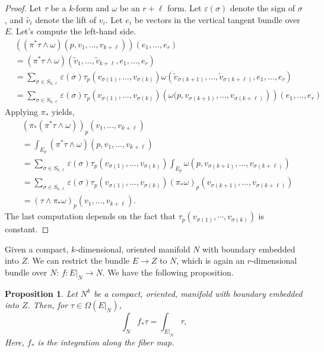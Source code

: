 \documentclass[12pt]{amsart}
\newtheorem{proposition}{Proposition}
\theoremstyle{remark}
\begin{document}
\begin{proof}
Let $\tau$ be a $k$-form and $\omega$ be an $r+\ell$ form. Let $\varepsilon(\sigma)$ denote the sign of $\sigma$, and $\tilde{v_i}$ denote the lift of $v_i$. Let $e_i$ be vectors in the vertical tangent bundle over $E$. Let's compute the left-hand side.
$$
\begin{aligned}
& \left(\left(\pi^* \tau \wedge \omega\right)(p, v_1, \ldots, v_{k+\ell})\right)\left(e_1, \ldots, e_r\right) \\
& =\left(\pi^* \tau \wedge \omega\right)\left(\widetilde{v}_1, \ldots, \widetilde{v}_{k+\ell}, e_1, \ldots, e_r\right) \\
& =\sum_{\sigma \in S_{k, \ell}} \varepsilon(\sigma) \tau_p\left(v_{\sigma(1)}, \ldots, v_{\sigma(k)}\right) \omega\left(\widetilde{v}_{\sigma(k+1)}, \ldots, \widetilde{v}_{\sigma(k+\ell)}, e_1, \ldots, e_r\right) \\
& =\sum_{\sigma \in S_{k, \ell}} \varepsilon(\sigma) \tau_p\left(v_{\sigma(1)}, \ldots, v_{\sigma(k)}\right)\left(\omega(\left.p, v_{\sigma(k+1)}, \ldots, v_{\sigma(k+\ell)}\right)\right)\left(e_1, \ldots, e_r\right)
\end{aligned}
$$
Applying $\pi_*$ yields,
$$
\begin{aligned}
& \left(\pi_*\left(\pi^* \tau \wedge \omega\right)\right)_p\left(v_1, \ldots, v_{k+\ell}\right) \\
& =\int_{E_p}\left(\pi^* \tau \wedge \omega\right)(p, v_1, \ldots, v_{k+\ell}) \\
& =\sum_{\sigma \in S_{k, \ell}} \varepsilon(\sigma) \tau_p\left(v_{\sigma(1)}, \ldots, v_{\sigma(k)}\right) \int_{E_p} \omega(p, v_{\sigma(k+1)}, \ldots, v_{\sigma(k+\ell)}) \\
& =\sum_{\sigma \in S_{k, \ell}} \varepsilon(\sigma) \tau_p\left(v_{\sigma(1)}, \ldots, v_{\sigma(k)}\right)\left(\pi_* \omega\right)_p\left(v_{\sigma(k+1)}, \ldots, v_{\sigma(k+\ell)}\right) \\
& =\left(\tau \wedge \pi_* \omega\right)_p\left(v_1, \ldots, v_{k+\ell}\right) .
\end{aligned}
$$
The last computation depends on the fact that $\tau_p(v_{\sigma(1)}, \cdots, v_{\sigma(k)})$ is constant.
\end{proof}
Given a compact, $k$-dimensional, oriented manifold $N$ with boundary embedded into $Z$. We can restrict the bundle $E\to Z$ to $N$, which is again an $r$-dimensional bundle over $N$: $f:E|_N\to N$. We have the following proposition.
\begin{proposition}
Let $N^k$ be a compact, oriented, manifold with boundary embedded into $Z$. Then, for $\tau\in \Omega(E|_N)$,
$$\int_N f_*\tau=\int_{E|_N}\tau,$$
Here, $f_*$ is the integration along the fiber map.
\end{proposition}
\end{document}
